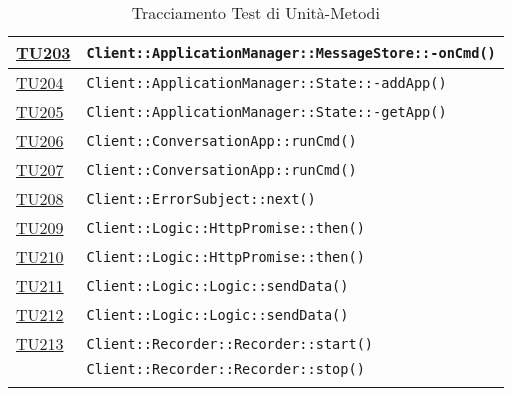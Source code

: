 \begin{longtable}{|>{\centering}m{1cm}|m{12cm}<{\centering}|}
\hyperlink{TU203}{TU203} & \texttt{Client::ApplicationManager::MessageStore::-\linebreak onCmd()}\\ \hline

\hyperlink{TU204}{TU204} & \texttt{Client::ApplicationManager::State::-\linebreak addApp()}\\ \hline

\hyperlink{TU205}{TU205} & \texttt{Client::ApplicationManager::State::-\linebreak getApp()}\\ \hline

\hyperlink{TU206}{TU206} & \texttt{Client::ConversationApp::runCmd()}\\ \hline

\hyperlink{TU207}{TU207} & \texttt{Client::ConversationApp::runCmd()}\\ \hline

\hyperlink{TU208}{TU208} & \texttt{Client::ErrorSubject::next()}\\ \hline

\hyperlink{TU209}{TU209} & \texttt{Client::Logic::HttpPromise::then()}\\ \hline

\hyperlink{TU210}{TU210} & \texttt{Client::Logic::HttpPromise::then()}\\ \hline

\hyperlink{TU211}{TU211} & \texttt{Client::Logic::Logic::sendData()}\\ \hline

\hyperlink{TU212}{TU212} & \texttt{Client::Logic::Logic::sendData()}\\ \hline

\hyperlink{TU213}{TU213} & \texttt{Client::Recorder::Recorder::start()}\\ & \texttt{Client::Recorder::Recorder::stop()}\\ \hline

\caption[Tracciamento Test di Unità-Metodi]{Tracciamento Test di Unità-Metodi}
\label{tabella:tu-met}
\end{longtable}
\clearpage
